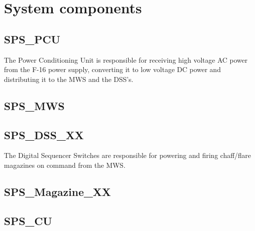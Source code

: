 \documentclass[Main]{subfiles}
\begin{document}
\section{System components}

\subsection{SPS\_PCU}
The Power Conditioning Unit is responsible for receiving high voltage AC power from the F-16 power supply, converting it to low voltage DC power and distributing it to the MWS and the DSS's.

\subsection{SPS\_MWS}

\subsection{SPS\_DSS\_XX}
The Digital Sequencer Switches are responsible for powering and firing chaff/flare magazines on command from the MWS.


\subsection{SPS\_Magazine\_XX}

\subsection{SPS\_CU}
\end{document}
